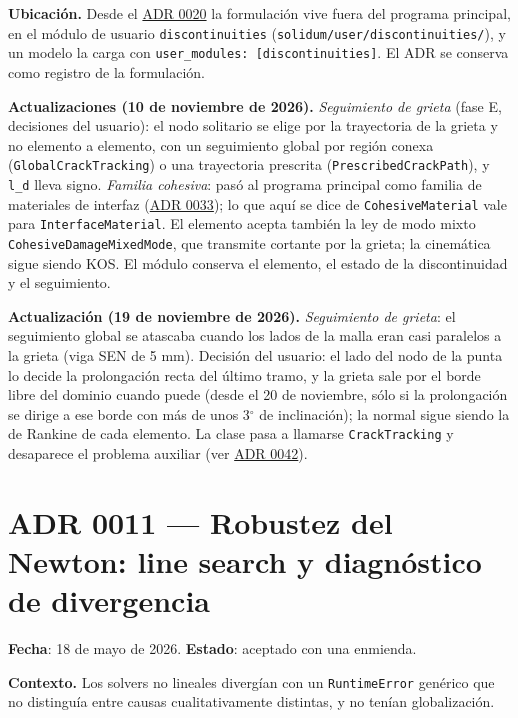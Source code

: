 \documentclass[11pt,oneside]{report}
\begin{document}
\textbf{Ubicación.} Desde el \hyperref[adr:0020]{ADR 0020} la formulación vive fuera del programa principal, en el módulo de usuario \texttt{discontinuities} (\texttt{solidum/\allowbreak{}user/\allowbreak{}discontinuities/\allowbreak{}}), y un modelo la carga con \texttt{user\_\allowbreak{}modules: [discontinuities]}. El ADR se conserva como registro de la formulación.

\textbf{Actualizaciones (10 de noviembre de 2026).} \textit{Seguimiento de grieta} (fase E, decisiones del usuario): el nodo solitario se elige por la trayectoria de la grieta y no elemento a elemento, con un seguimiento global por región conexa (\texttt{GlobalCrackTracking}) o una trayectoria prescrita (\texttt{PrescribedCrackPath}), y \texttt{l\_d} lleva signo. \textit{Familia cohesiva}: pasó al programa principal como familia de materiales de interfaz (\hyperref[adr:0033]{ADR 0033}); lo que aquí se dice de \texttt{CohesiveMaterial} vale para \texttt{InterfaceMaterial}. El elemento acepta también la ley de modo mixto \texttt{CohesiveDamageMixedMode}, que transmite cortante por la grieta; la cinemática sigue siendo KOS. El módulo conserva el elemento, el estado de la discontinuidad y el seguimiento.

\textbf{Actualización (19 de noviembre de 2026).} \textit{Seguimiento de grieta}: el seguimiento global se atascaba cuando los lados de la malla eran casi paralelos a la grieta (viga SEN de 5 mm). Decisión del usuario: el lado del nodo de la punta lo decide la prolongación recta del último tramo, y la grieta sale por el borde libre del dominio cuando puede (desde el 20 de noviembre, sólo si la prolongación se dirige a ese borde con más de unos 3\ensuremath{^{\circ}} de inclinación); la normal sigue siendo la de Rankine de cada elemento. La clase pasa a llamarse \texttt{CrackTracking} y desaparece el problema auxiliar (ver \hyperref[adr:0042]{ADR 0042}).

\section{ADR 0011 --- Robustez del Newton: line search y diagnóstico de divergencia}
\label{adr:0011}

\textbf{Fecha}: 18 de mayo de 2026. \textbf{Estado}: aceptado con una enmienda.

\textbf{Contexto.} Los solvers no lineales divergían con un \texttt{RuntimeError} genérico que no distinguía entre causas cualitativamente distintas, y no tenían globalización.
\end{document}
